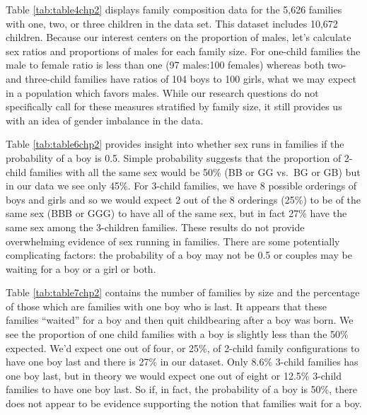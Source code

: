 \documentclass[
]{krantz}
\begin{document}
Table \ref{tab:table4chp2} displays family composition data for the 5,626 families with one, two, or three children in the data set. This dataset includes 10,672 children. Because our interest centers on the proportion of males, let's calculate sex ratios and proportions of males for each family size. For one-child families the male to female ratio is less than one (97 males:100 females) whereas both two- and three-child families have ratios of 104 boys to 100 girls, what we may expect in a population which favors males. While our research questions do not specifically call for these measures stratified by family size, it still provides us with an idea of gender imbalance in the data.

Table \ref{tab:table6chp2} provides insight into whether sex runs in families if the probability of a boy is 0.5. Simple probability suggests that the proportion of 2-child families with all the same sex would be 50\% (BB or GG vs.~BG or GB) but in our data we see only 45\%. For 3-child families, we have 8 possible orderings of boys and girls and so we would expect 2 out of the 8 orderings (25\%) to be of the same sex (BBB or GGG) to have all of the same sex, but in fact 27\% have the same sex among the 3-children families. These results do not provide overwhelming evidence of sex running in families. There are some potentially complicating factors: the probability of a boy may not be 0.5 or couples may be waiting for a boy or a girl or both.

\begin{table}[t]

\caption{\label{tab:table6chp2}Proportion of families with all the same sex by number of children in the family. Note that 1-child families are all homogeneous with respect to sex so we look at 2- and 3- child families.}
\centering
{}
\end{table}

Table \ref{tab:table7chp2} contains the number of families by size and the percentage of those which are families with one boy who is last. It appears that these families ``waited'' for a boy and then quit childbearing after a boy was born. We see the proportion of one child families with a boy is slightly less than the 50\% expected. We'd expect one out of four, or 25\%, of 2-child family configurations to have one boy last and there is 27\% in our dataset. Only 8.6\% 3-child families has one boy last, but in theory we would expect one out of eight or 12.5\% 3-child families to have one boy last. So if, in fact, the probability of a boy is 50\%, there does not appear to be evidence supporting the notion that families wait for a boy.
\end{document}
